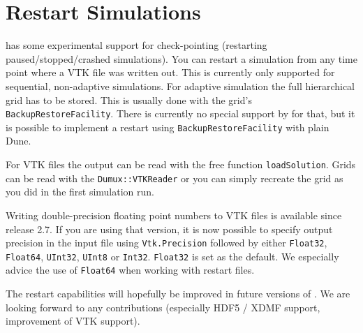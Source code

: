 \section{Restart \Dumux Simulations}
\label{sc_restartsimulations}

\Dumux has some experimental support for check-pointing (restarting paused/stopped/crashed simulations).
You can restart a \Dumux simulation from any time point where a VTK file was written out.
This is currently only supported for sequential, non-adaptive simulations. For adaptive simulation
the full hierarchical grid has to be stored. This is usually done with the grid's \texttt{BackupRestoreFacility}.
There is currently no special support by \Dumux for that, but it is possible to implement
a restart using \texttt{BackupRestoreFacility} with plain Dune.

For VTK files the output can be read with the free function \texttt{loadSolution}. Grids can be read with
the \texttt{Dumux::VTKReader} or you can simply recreate the grid as you did in the first simulation run.

Writing double-precision floating point numbers to VTK files is available since \Dune release 2.7. If you are using that version, it is now possible to specify output precision in the input file using \texttt{Vtk.Precision} followed by either \texttt{Float32}, \texttt{Float64}, \texttt{UInt32}, \texttt{UInt8} or \texttt{Int32}. \texttt{Float32} is set as the default. We especially advice the use of \texttt{Float64} when working with restart files.

The restart capabilities will hopefully be improved in future versions of .
We are looking forward to any contributions (especially HDF5 / XDMF support, improvement of VTK support).
